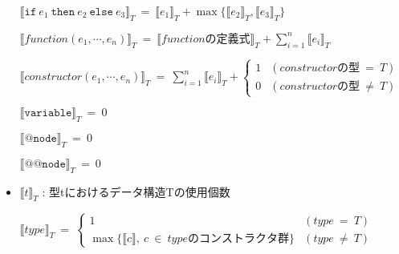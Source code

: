 \begin{figure}[p]
\begin{framed}
\begin{itemize}
  \begin{math}
    \llbracket \texttt{if} \ e_1 \ \texttt{then} \ e_2 \ \texttt{else} \ e_3 \rrbracket _T
    \ = \
    \llbracket e_1 \rrbracket _T + \max \{ \llbracket e_2 \rrbracket _T, \llbracket e_3 \rrbracket _T \}
  \end{math}
  \vspace{10pt}

  \begin{math}
    \llbracket function(e_1, \cdots, e_n) \rrbracket _T
    \ = \
    \llbracket functionの定義式 \rrbracket _T + \sum^n_{i=1} \llbracket e_i \rrbracket _T
  \end{math}
  \vspace{10pt}

  \begin{math}
    \llbracket constructor(e_1, \cdots, e_n) \rrbracket _T
    \ = \
    \sum^n_{i=1} \llbracket e_i \rrbracket _T +
    \begin{cases}
      1 & (constructorの型 \ = \ T) \\
      0 & (constructorの型 \ \neq \ T)
    \end{cases}
  \end{math}
  \vspace{10pt}

  \begin{math}
    \llbracket \texttt{variable} \rrbracket _T \ = \ 0
  \end{math}
  \vspace{10pt}

  \begin{math}
    \llbracket \texttt{@node} \rrbracket _T \ = \ 0
  \end{math}
  \vspace{10pt}

  \begin{math}
    \llbracket \texttt{@@node} \rrbracket _T \ = \ 0
  \end{math}

  \item $\llbracket t \rrbracket _T $ : 型tにおけるデータ構造Tの使用個数 \vspace{10pt}

  \begin{math}
    \llbracket
      type
    \rrbracket _T
    \ = \
    \begin{cases}
      1 & (type \ = \ T) \\
      \max \{ \llbracket c \rrbracket, \ c \ \in \ typeのコンストラクタ群 \} & (type \ \neq \ T)
    \end{cases}
  \end{math}
  \vspace{10pt}


\end{itemize}
\end{framed}
\end{figure}
